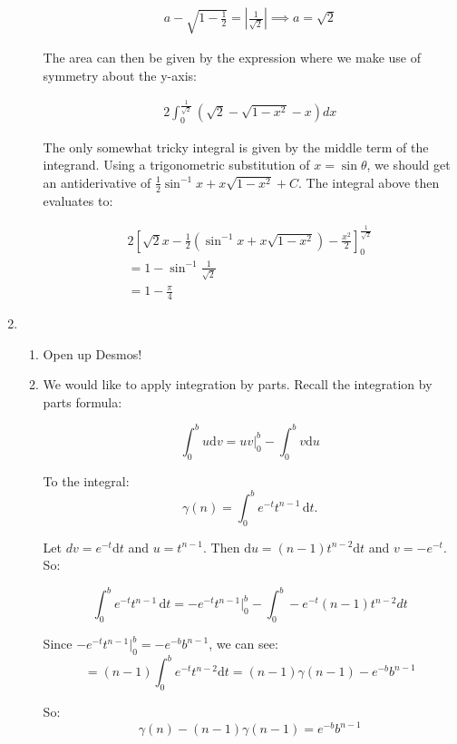 \begin{enumerate}
\begin{enumerate}
	    \begin{align*}
	        a - \sqrt{1 - \frac{1}{2}} = \left|\frac{1}{\sqrt{2}}\right| \implies a = \sqrt{2}
	    \end{align*}
	    
	    The area can then be given by the expression where we make use of symmetry about the y-axis:
	    
	    \begin{align*}
	        2\int_0^\frac{1}{\sqrt{2}}\left(\sqrt{2} - \sqrt{1 - x^2} - x\right)dx
	    \end{align*}
	    
	    The only somewhat tricky integral is given by the middle term of the integrand. Using a trigonometric substitution of $x = \sin\theta$, we should get an antiderivative of $\frac{1}{2}\sin^{-1}x + x\sqrt{1-x^2} + C$. The integral above then evaluates to:
	    
	    \begin{align*}
	        2\left[\sqrt{2}x - \frac{1}{2}\left(\sin^{-1}x + x\sqrt{1-x^2}\right) - \frac{x^2}{2}\right]_0^\frac{1}{\sqrt{2}} \\ 
	        = 1 - \sin^{-1}\frac{1}{\sqrt{2}} \\ 
	        = 1 - \frac{\pi}{4}
	    \end{align*}
\end{enumerate}

\item 
\begin{enumerate}
    \item Open up Desmos!
    \item We would like to apply integration by parts. Recall the integration by parts formula:

    \[
    \int_0^b u\mathrm dv = uv|_0^b - \int_0^b v\mathrm du
    \]

    To the integral:
    \[
        \gamma(n) = \int_0^b e^{-t}t^{n-1}\,\mathrm dt.
    \]
    
    Let $dv = e^{-t}\mathrm dt$ and $u = t^{n-1}$. Then $\mathrm d u = (n-1)t^{n-2} \mathrm d t$ and $v = -e^{-t}$. So:

    
    \[
        \int_0^b e^{-t}t^{n-1}\,\mathrm dt = -e^{-t}t^{n-1}|_0^b -\int_0^b -e^{-t}(n-1)t^{n-2}dt
    \]
    
    Since $-e^{-t}t^{n-1}|_0^b = -e^{-b}b^{n-1}$, we can see:
    \[
        =(n-1)\int_0^b e^{-t}t^{n-2}\mathrm dt =(n-1) \gamma(n-1)  -e^{-b}b^{n-1}
    \]

    So:
    \[
        \gamma(n) - (n-1)\gamma(n-1) = e^{-b}b^{n-1}
    \]


\end{enumerate}
\end{enumerate}
